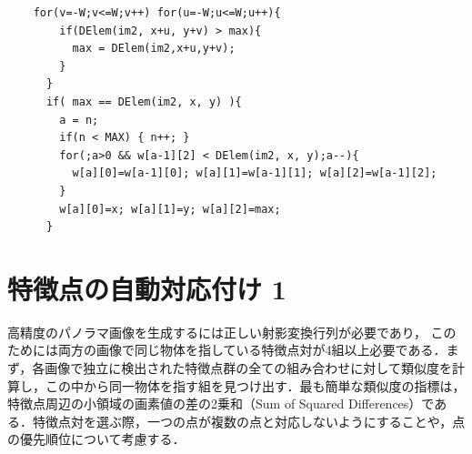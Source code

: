 \documentclass[11pt]{jarticle}
\begin{document}
\begin{verbatim}
    for(v=-W;v<=W;v++) for(u=-W;u<=W;u++){
        if(DElem(im2, x+u, y+v) > max){
          max = DElem(im2,x+u,y+v);
        }
      }
      if( max == DElem(im2, x, y) ){
        a = n;
        if(n < MAX) { n++; }
        for(;a>0 && w[a-1][2] < DElem(im2, x, y);a--){
          w[a][0]=w[a-1][0]; w[a][1]=w[a-1][1]; w[a][2]=w[a-1][2];
        }
        w[a][0]=x; w[a][1]=y; w[a][2]=max;
      }
\end{verbatim}

\section{特徴点の自動対応付け 1}
高精度のパノラマ画像を生成するには正しい射影変換行列が必要であり， このためには両方の画像で同じ物体を指している特徴点対が4組以上必要である．まず，各画像で独立に検出された特徴点群の全ての組み合わせに対して類似度を計算し，この中から同一物体を指す組を見つけ出す．最も簡単な類似度の指標は，特徴点周辺の小領域の画素値の差の2乗和（Sum of Squared Differences）である．特徴点対を選ぶ際，一つの点が複数の点と対応しないようにすることや，点の優先順位について考慮する．
\end{document}
